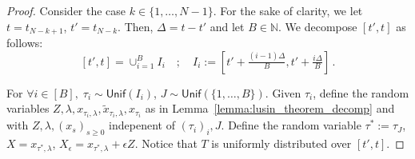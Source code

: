 \begin{proof}
Consider the case $k \in \{1,\dots,N-1\}$. For the sake of clarity, we let $t = t_{N-k+1}$, $t' = t_{N-k}$. Then, $\Delta = t-t'$ and let $B \in \mathbb{N}$. We decompose $[t',t]$ as follows:
$$[t',t] = \cup_{i=1}^{B}I_i \quad ;\quad I_i := [t'+\tfrac{(i-1)\Delta}{B},t' + \tfrac{i\Delta}{B}]\,.$$


For $\forall i \in [B], \; \tau_{i} \sim \mathsf{Unif}(I_i)$, $J \sim \mathsf{Unif}(\{1,\dots,B\})$. Given $\tau_i$, define the random variables $Z,\lambda,x_{\tau_i,\lambda},\tilde{x}_{\tau_i,\lambda},x_{\tau_i}$ as in Lemma~\ref{lemma:lusin_theorem_decomp} and with $Z,\lambda, (x_s)_{s\geq 0}$ indepenent of $(\tau_i)_i,J$. Define the random variable $ \tau^* := \tau_J$, $X = x_{\tau^*,\lambda}$, $X_\epsilon = x_{\tau^*,\lambda}+\epsilon Z$. Notice that $T$ is uniformly distributed over $[t',t]$.


\end{proof}
